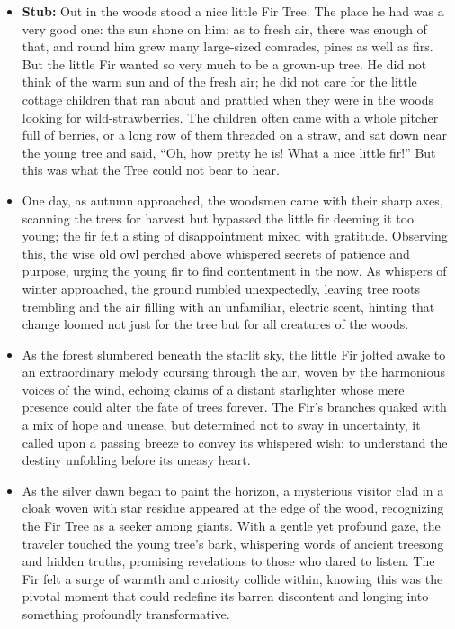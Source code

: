 \documentclass[11pt]{article}
\begin{document}
\begin{small}
\begin{itemize}
    \item \textbf{Stub:} Out in the woods stood a nice little Fir Tree. The place he had was a very good one: 
    the sun shone on him: as to fresh air, there was enough of that, and round him grew many large-sized 
    comrades, pines as well as firs. But the little Fir wanted so very much to be a grown-up tree. He did 
    not think of the warm sun and of the fresh air; he did not care for the little cottage children that 
    ran about and prattled when they were in the woods looking for wild-strawberries. The children often 
    came with a whole pitcher full of berries, or a long row of them threaded on a straw, and sat down 
    near the young tree and said, ``Oh, how pretty he is! What a nice little fir!'' But this was what the 
    Tree could not bear to hear.

    \item One day, as autumn approached, the woodsmen came with their sharp axes, scanning the trees for 
    harvest but bypassed the little fir deeming it too young; the fir felt a sting of disappointment mixed 
    with gratitude. Observing this, the wise old owl perched above whispered secrets of patience and 
    purpose, urging the young fir to find contentment in the now. As whispers of winter approached, the 
    ground rumbled unexpectedly, leaving tree roots trembling and the air filling with an unfamiliar, 
    electric scent, hinting that change loomed not just for the tree but for all creatures of the woods.

    \item As the forest slumbered beneath the starlit sky, the little Fir jolted awake to an extraordinary 
    melody coursing through the air, woven by the harmonious voices of the wind, echoing claims of a 
    distant starlighter whose mere presence could alter the fate of trees forever. The Fir's branches 
    quaked with a mix of hope and unease, but determined not to sway in uncertainty, it called upon a 
    passing breeze to convey its whispered wish: to understand the destiny unfolding before its uneasy 
    heart.

    \item As the silver dawn began to paint the horizon, a mysterious visitor clad in a cloak woven with 
    star residue appeared at the edge of the wood, recognizing the Fir Tree as a seeker among giants. 
    With a gentle yet profound gaze, the traveler touched the young tree's bark, whispering words of 
    ancient treesong and hidden truths, promising revelations to those who dared to listen. The Fir felt 
    a surge of warmth and curiosity collide within, knowing this was the pivotal moment that could redefine 
    its barren discontent and longing into something profoundly transformative.


\end{itemize}
\end{small}
\end{document}
